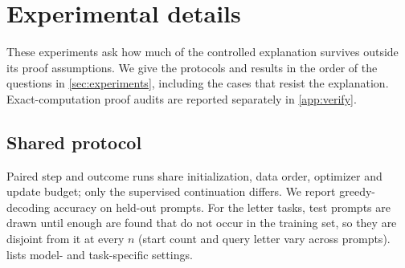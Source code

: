 \section{Experimental details}
\label{app:experiments}
\label{app:experimental-details}
These experiments ask how much of the controlled explanation survives outside its proof assumptions. We give the protocols and
results in the order of the questions in \cref{sec:experiments}, including the cases that resist the explanation. Exact-computation
proof audits are reported separately in \cref{app:verify}.

\subsection{Shared protocol}
\label{app:letter-protocol}
Paired step and outcome runs share initialization, data order, optimizer and update budget; only the supervised continuation differs.
We report greedy-decoding accuracy on held-out prompts. For the letter tasks, test prompts are drawn until enough are found that do not
occur in the training set, so they are disjoint from it at every $n$ (start count and query letter vary across prompts).  lists model- and task-specific settings.

\begin{table}[H]
\centering\small
{}
\caption{\textbf{Shared experimental settings.} Task-specific exceptions are stated in the corresponding subsections.}
\label{tab:protocol}
\end{table}


